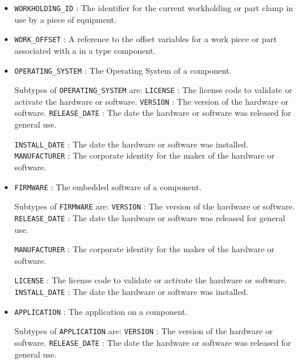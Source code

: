 \begin{itemize}
\item \texttt{WORKHOLDING_ID} : The identifier for the current workholding or part clamp in use by a piece of equipment. 

\item \texttt{WORK_OFFSET} : A reference to the offset variables for a work piece or part associated with a  in a  type component. 

\item \texttt{OPERATING_SYSTEM} : The Operating System of a component. 

Subtypes of \texttt{OPERATING_SYSTEM} are: 
\newline\tab \texttt{LICENSE} : The license code to validate or activate the hardware or software. 
\newline\tab \texttt{VERSION} : The version of the hardware or software. 
\newline\tab \texttt{RELEASE_DATE} : The date the hardware or software was released for general use.
 
\newline\tab \texttt{INSTALL_DATE} : The date the hardware or software was installed. 
\newline\tab \texttt{MANUFACTURER} : The corporate identity for the maker of the hardware or software.
 
\item \texttt{FIRMWARE} : The embedded software of a component.
 

Subtypes of \texttt{FIRMWARE} are: 
\newline\tab \texttt{VERSION} : The version of the hardware or software. 
\newline\tab \texttt{RELEASE_DATE} : The date the hardware or software was released for general use.
 
\newline\tab \texttt{MANUFACTURER} : The corporate identity for the maker of the hardware or software.
 
\newline\tab \texttt{LICENSE} : The license code to validate or activate the hardware or software. 
\newline\tab \texttt{INSTALL_DATE} : The date the hardware or software was installed. 
\item \texttt{APPLICATION} : The application on a component. 

Subtypes of \texttt{APPLICATION} are: 
\newline\tab \texttt{VERSION} : The version of the hardware or software. 
\newline\tab \texttt{RELEASE_DATE} : The date the hardware or software was released for general use.
 

\end{itemize}
